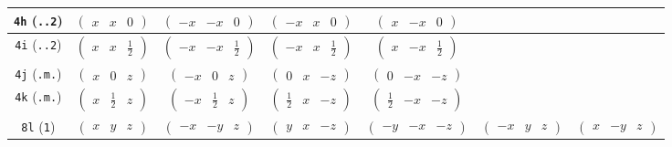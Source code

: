 \documentclass[fleqn,9pt,landscape]{jsarticle}
\begin{document}
\begin{center}
\begin{longtable}{ccccccc}
{\tt 4h} ({\tt ..2}) & $ \begin{pmatrix} x & x & 0 \end{pmatrix} $ & $ \begin{pmatrix} - x & - x & 0 \end{pmatrix} $ & $ \begin{pmatrix} - x & x & 0 \end{pmatrix} $ & $ \begin{pmatrix} x & - x & 0 \end{pmatrix} $ & $  $ & $  $ \\ \hline
{\tt 4i} ({\tt ..2}) & $ \begin{pmatrix} x & x & \frac{1}{2} \end{pmatrix} $ & $ \begin{pmatrix} - x & - x & \frac{1}{2} \end{pmatrix} $ & $ \begin{pmatrix} - x & x & \frac{1}{2} \end{pmatrix} $ & $ \begin{pmatrix} x & - x & \frac{1}{2} \end{pmatrix} $ & $  $ & $  $ \\ \hline
{\tt 4j} ({\tt .m.}) & $ \begin{pmatrix} x & 0 & z \end{pmatrix} $ & $ \begin{pmatrix} - x & 0 & z \end{pmatrix} $ & $ \begin{pmatrix} 0 & x & - z \end{pmatrix} $ & $ \begin{pmatrix} 0 & - x & - z \end{pmatrix} $ & $  $ & $  $ \\ \hline
{\tt 4k} ({\tt .m.}) & $ \begin{pmatrix} x & \frac{1}{2} & z \end{pmatrix} $ & $ \begin{pmatrix} - x & \frac{1}{2} & z \end{pmatrix} $ & $ \begin{pmatrix} \frac{1}{2} & x & - z \end{pmatrix} $ & $ \begin{pmatrix} \frac{1}{2} & - x & - z \end{pmatrix} $ & $  $ & $  $ \\ \hline
{\tt 8l} ({\tt 1}) & $ \begin{pmatrix} x & y & z \end{pmatrix} $ & $ \begin{pmatrix} - x & - y & z \end{pmatrix} $ & $ \begin{pmatrix} y & x & - z \end{pmatrix} $ & $ \begin{pmatrix} - y & - x & - z \end{pmatrix} $ & $ \begin{pmatrix} - x & y & z \end{pmatrix} $ & $ \begin{pmatrix} x & - y & z \end{pmatrix} $ \\

\end{longtable}
\end{center}
\end{document}
